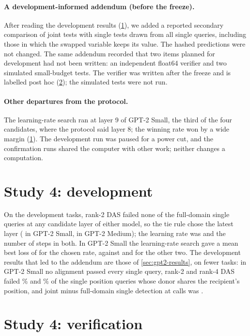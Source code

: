 \paragraph{A development-informed addendum (before the freeze).} After reading the development results
(\cref{app:gpt2-development}), we added a reported secondary comparison of joint tests with single tests drawn
from all single queries, including those in which the swapped variable keeps its value. The hashed predictions were
not changed. The same addendum recorded that two items planned for development had not been written: an independent
float64 verifier and two simulated small-budget tests. The verifier was written after the freeze and is labelled post
hoc (\cref{app:gpt2-verification}); the simulated tests were not run.

\paragraph{Other departures from the protocol.} The learning-rate search ran at layer 9 of GPT-2 Small, the third of
the four candidates, where the protocol said layer 8; the winning rate won by a wide margin
(\cref{app:gpt2-development}). The development run was paused for a power cut, and the confirmation runs shared the
computer with other work; neither changes a computation.

\section{Study 4: development}\label{app:gpt2-development}

On the development tasks, rank-2 DAS failed none of the full-domain single queries at any candidate layer of either
model, so the tie rule chose the latest layer (\LayerSmall{} in GPT-2 Small, \LayerMedium{} in GPT-2 Medium); the
learning rate was \LrSmall{} and the number of steps \StepsSmall{} in both. In GPT-2 Small the learning-rate
search gave a mean best loss of \LrLossBest{} for the chosen rate, against \LrLossSecond{} and \LrLossThird{} for the
other two. The development results that led to the addendum are those of \cref{sec:gpt2-results}, on fewer tasks: in
GPT-2 Small no alignment passed every single query, rank-2 and rank-4 DAS failed \DevUnchangedRTwoPct\% and
\DevUnchangedRFourPct\% of the single position queries whose donor shares the recipient's position, and joint minus
full-domain single detection at \Budget{} calls was \DevContrastSmall.

\section{Study 4: verification}\label{app:gpt2-verification}

